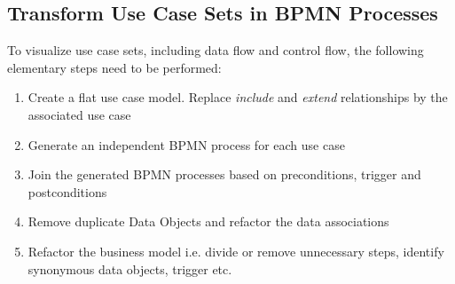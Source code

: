 \subsection{Transform Use Case Sets in BPMN Processes}
To visualize use case sets, including data flow and control flow, the following elementary steps need to be performed:

\begin{enumerate}
	\item Create a flat use case model. Replace \textit{include} and \textit{extend} relationships by the associated use case
	\item Generate an independent BPMN process for each use case
    \item Join the generated BPMN processes based on preconditions, trigger and postconditions
    \item Remove duplicate Data Objects and refactor the data associations
    \item Refactor the business model i.e. divide or remove unnecessary steps, identify synonymous data objects, trigger etc.
\end{enumerate}


